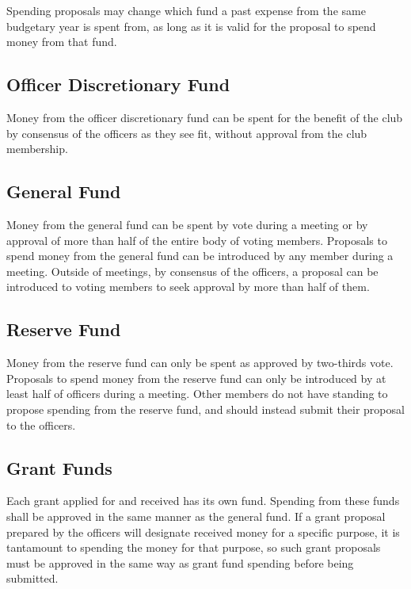 \documentclass{article}
\begin{document}
Spending proposals may change which fund a past expense from the same budgetary
year is spent from, as long as it is valid for the proposal to spend money from
that fund.

\subsection{Officer Discretionary Fund}

Money from the officer discretionary fund can be spent for the benefit of the
club by consensus of the officers as they see fit, without approval from the
club membership.

\subsection{General Fund}

Money from the general fund can be spent by vote during a meeting or by approval
of more than half of the entire body of voting members. Proposals to spend money
from the general fund can be introduced by any member during a meeting. Outside
of meetings, by consensus of the officers, a proposal can be introduced to
voting members to seek approval by more than half of them.

\subsection{Reserve Fund}

Money from the reserve fund can only be spent as approved by two-thirds vote.
Proposals to spend money from the reserve fund can only be introduced by at
least half of officers during a meeting. Other members do not have standing to
propose spending from the reserve fund, and should instead submit their proposal
to the officers.

\subsection{Grant Funds}

Each grant applied for and received has its own fund. Spending from these funds
shall be approved in the same manner as the general fund. If a grant proposal
prepared by the officers will designate received money for a specific purpose,
it is tantamount to spending the money for that purpose, so such grant proposals
must be approved in the same way as grant fund spending before being submitted.
\end{document}
